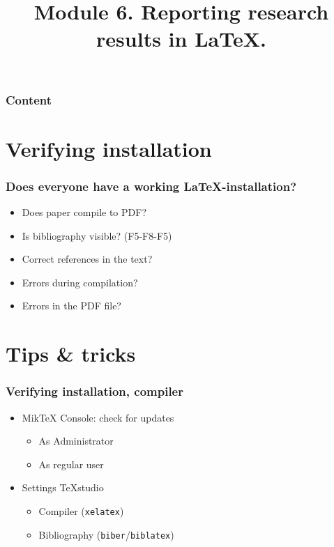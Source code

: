 \documentclass[aspectratio=169]{beamer}
\title{Module 6. Reporting research results in \LaTeX{}.}
\subtitle{\coursename}
\author{\lecturers}   %
\date{\academicyear}
\begin{document}
\begin{frame}
  \maketitle
\end{frame}

\begin{frame}
  \frametitle{Content}

  \tableofcontents
\end{frame}

\section{Verifying installation}

\begin{frame}
  \frametitle{Does everyone have a working {\LaTeX}-installation?}

  \begin{itemize}
   \item Does paper compile to PDF?
   \item Is bibliography visible? (F5-F8-F5)
   \item Correct references in the text?
   \item Errors during compilation?
   \item Errors in the PDF file?
  \end{itemize}
  
  \bigskip
  

\end{frame}

\section{Tips \& tricks}


\begin{frame}
  \frametitle{Verifying installation, compiler}

  \begin{itemize}
    \item Mik{\TeX} Console: check for updates
          \begin{itemize}
            \item As Administrator
            \item As regular user
          \end{itemize}
    \item Settings TeXstudio
          \begin{itemize}
            \item Compiler (\texttt{xelatex})
            \item Bibliography (\texttt{biber}/\texttt{biblatex})
          \end{itemize}
  \end{itemize}

\end{frame}
\end{document}
